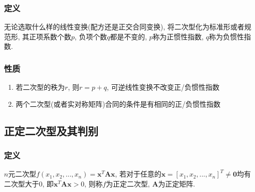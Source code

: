 \subsubsection{定义}
无论选取什么样的线性变换(配方还是正交合同变换), 将二次型化为标准形或者规范形, 其正项系数个数$ p $, 负项个数$ q $都是不变的, $ p $称为正惯性指数, $ q $称为负惯性指数.
\subsubsection{性质}
\begin{enumerate}
\item 若二次型的秩为$ r $, 则$ r=p+q $, 可逆线性变换不改变正/负惯性指数
\item 两个二次型(或者实对称矩阵)合同的条件是有相同的正/负惯性指数
\end{enumerate}
\subsection{正定二次型及其判别}
\subsubsection{定义}
$ n $元二次型$ f(x_{1}, x_{2},... ,x_{n})=\bm{x}^{T}\bm{A}\bm{x} $, 若对于任意的$ \bm{x}=[x_{1},x_{2},... ,x_{n}]^{T}\neq \bm{0} $均有二次型大于0, 即$ \bm{x}^{T}\bm{A}\bm{x}>0 $, 则称$ f $为正定二次型, $ \bm{A} $为正定矩阵.
